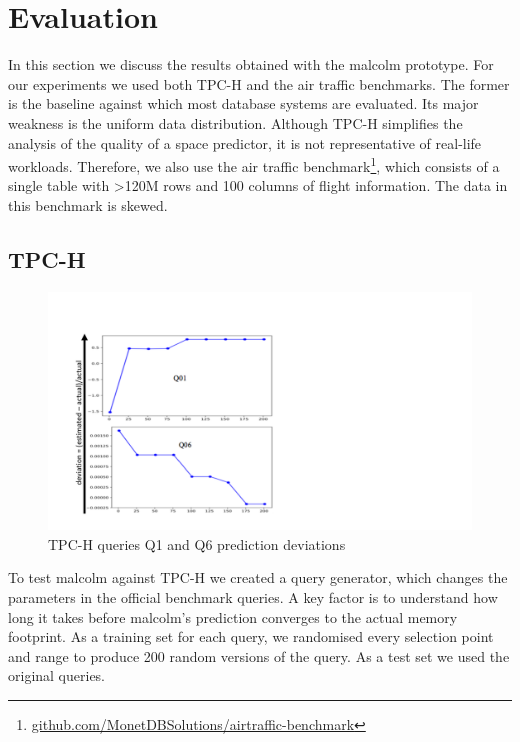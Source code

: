 \documentclass[conference]{IEEEtran}
\begin{document}
\section{Evaluation}
\label{sec:evaluation}
In this section we discuss the results obtained with the {\sc malcolm} prototype.
For our experiments we used both TPC-H and the air traffic benchmarks.
The former is the baseline against which most database systems are evaluated.
Its major weakness is the uniform data distribution.
Although TPC-H simplifies the analysis of the quality of a space predictor, it is not representative of real-life workloads.
Therefore, we also use the air traffic benchmark\footnote{\url{github.com/MonetDBSolutions/airtraffic-benchmark}}, which consists of a single table with \textgreater 120M rows and 100 columns of flight information.
The data in this benchmark is skewed.

\subsection{TPC-H}

\begin{figure}[t!]
	\centering
	\includegraphics[width=0.95\columnwidth]{Figures/tpch.pdf}
	\caption{TPC-H queries Q1 and Q6 prediction deviations
		\label{fig:tpch-q1-q6}}
\end{figure}

To test {\sc malcolm} against TPC-H we created a query generator, which changes the parameters in the official benchmark queries.
A key factor is to understand how long it takes before {\sc malcolm}'s prediction converges to the actual memory footprint.
As a training set for each query, we randomised every selection point and range to produce 200 random versions of the query.
As a test set we used the original queries.
\end{document}
